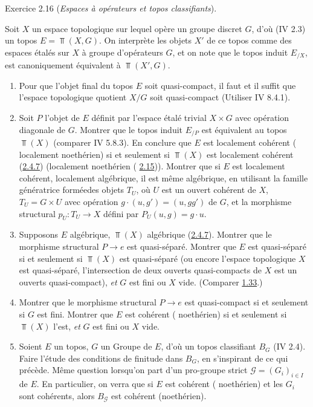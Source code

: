 \begin{enonce*}[remark]{Exercice 2.16}
(\emph{Espaces à opérateurs et topos classifiants}).

Soit $X$ un espace topologique sur lequel opère un groupe discret
$G$, d'où (IV 2.3) un topos $E = \Top(X, G)$. On interprète les
objets $X'$ de ce topos comme des espaces étalés sur $X$ à groupe
d'opérateurs $G$, et on note que le topos induit $E_{/X}$, est
canoniquement équivalent à $\Top(X', G)$.
\begin{enumerate}
\renewcommand{\theenumi}{\alph{enumi}}
\renewcommand{\labelenumi}{\theenumi)}
\item Pour que l'objet final du topos $E$ soit quasi-compact, il faut
  et il suffit que l'espace topologique quotient $X/G$ soit
  quasi-compact (Utiliser IV 8.4.1).

\item Soit $P$ l'objet de $E$ définit par l'espace étalé trivial $X
  \times G$ avec opération diagonale de $G$. Montrer que le topos
  induit $E_{/P}$ est équivalent au topos $\Top(X)$ (comparer IV
  5.8.3). En conclure que $E$ est localement cohérent (\resp
  localement noethérien) si et seulement si $\Top(X)$ est localement
  cohérent (\cf \hyperref[VI.subsubsec2.4.7]{2.4.7}) (\resp localement noethérien (\cf
  \hyperref[VI.exem2.15]{2.15})). Montrer que si $E$ est localement cohérent, \ie localement
  algébrique, il est même algébrique, en utilisant la famille
  génératrice formée\pageoriginale des objets $T_U$, où $U$ est un
  ouvert cohérent   de $X$, $T_U = G \times U$ avec opération $g \cdot (u, g') =
  (u, gg')$ de $G$, et la morphisme structural $p_U : T_U \to X$ défini
  par $P_U(u, g) = g\cdot u$.

\item Supposons $E$ algébrique, \ie $\Top(X)$ algébrique
  (\hyperref[VI.subsubsec2.4.7]{2.4.7}). Montrer que le morphisme structural $P \to e$ est
  quasi-séparé. Montrer que $E$ est quasi-séparé si et seulement si
  $\Top(X)$ est quasi-séparé (ou encore l'espace topologique $X$ est
  quasi-séparé, \ie l'intersection de deux ouverts quasi-compacts de
  $X$ est un ouverts quasi-compact), \emph{et} $G$ est fini ou $X$
  vide. (Comparer \hyperref[VI.exem1.33]{1.33}.)

\item Montrer que le morphisme structural $P \to e$ est quasi-compact
  si et seulement si $G$ est fini. Montrer que $E$ est cohérent (\resp
  noethérien) si et seulement si $\Top(X)$ l'est, \emph{et} $G$ est
  fini ou $X$ vide.

\item Soient $E$ un topos, $G$ un Groupe de $E$, d'où un topos
  classifiant $B_G$ (IV 2.4). Faire l'étude des conditions de finitude
  dans $B_G$, en s'inspirant de ce qui précède. Même question
  lorsqu'on part d'un pro-groupe strict $𝒢 = (G_i)_{i \in I}$ de
  $E$. En particulier, on verra que si $E$ est cohérent (\resp
  noethérien) et les $G_i$ sont cohérents, alors $B_{𝒢}$ est cohérent
  (\resp noethérien).
\end{enumerate}
\end{enonce*}

